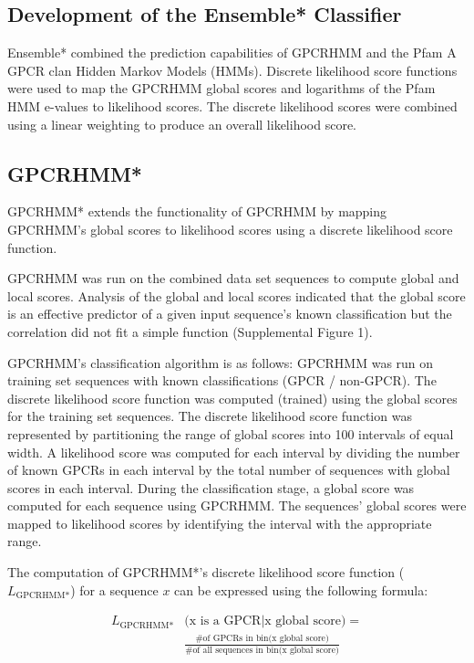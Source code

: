 \subsection{Development of the Ensemble* Classifier}

Ensemble* combined the prediction capabilities of GPCRHMM and the Pfam A GPCR clan Hidden Markov Models (HMMs).
Discrete likelihood score functions were used to map the GPCRHMM global scores and logarithms of the Pfam HMM e-values to likelihood scores.
The discrete likelihood scores were combined using a linear weighting to produce an overall likelihood score.

\subsection{GPCRHMM*}
GPCRHMM* extends the functionality of GPCRHMM by mapping GPCRHMM's global scores to likelihood scores using a discrete likelihood score function.

GPCRHMM was run on the combined data set sequences to compute global and local scores. Analysis of the global and local scores indicated that the global score is an effective predictor of a given input sequence's known classification but the correlation did not fit a simple function (Supplemental Figure 1).  

GPCRHMM's classification algorithm is as follows: GPCRHMM was run on training set sequences with known classifications (GPCR / non-GPCR). The discrete likelihood score function was computed (trained) using the global scores for the training set sequences. The discrete likelihood score function was represented by partitioning the range of global scores into 100 intervals of equal width. A likelihood score was computed for each interval by dividing the number of known GPCRs in each interval by the total number of sequences with global scores in each interval. During the classification stage, a global score was computed for each sequence using GPCRHMM.  The sequences' global scores were mapped to likelihood scores by identifying the interval with the appropriate range.


The computation of GPCRHMM*'s discrete likelihood score function ($L_{\text{GPCRHMM*}}$) for a sequence $x$ can be expressed using the following formula:

\begin{align*}
L_{\text{GPCRHMM*}}&\text{(x is a GPCR} | \text{x global score)} = \\
&\frac{\text{\# of GPCRs in bin(x global score)}}{\text{\# of all sequences in bin(x global score)}}
\end{align*} 

